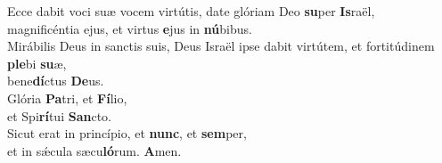 \oddverse Ecce dabit voci suæ vocem virtútis, date glóriam Deo \textbf{su}per \textbf{Is}raël,~\*\\
\oddverse magnificéntia ejus, et virtus \textbf{e}jus in \textbf{nú}bibus.\\
\evenverse Mirábilis Deus in sanctis suis, Deus Israël ipse dabit virtútem, et fortitúdinem \textbf{ple}bi \textbf{su}æ,~\*\\
\evenverse bene\textbf{dí}ctus \textbf{De}us.\\
\oddverse Glória \textbf{Pa}tri, et \textbf{Fí}lio,~\*\\
\oddverse et Spi\textbf{rí}tui \textbf{San}cto.\\
\evenverse Sicut erat in princípio, et \textbf{nunc}, et \textbf{sem}per,~\*\\
\evenverse et in sǽcula sæcu\textbf{ló}rum. \textbf{A}men.\\
